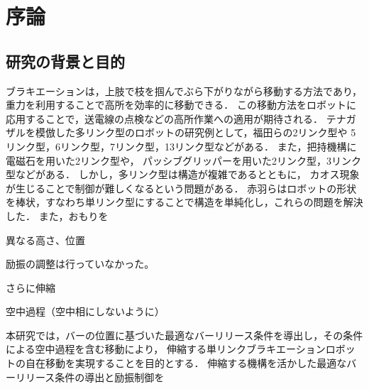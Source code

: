 \chapter[序論]%
        {序論}
        \section{研究の背景と目的}

          ブラキエーションは，上肢で枝を掴んでぶら下がりながら移動する方法であり，重力を利用することで高所を効率的に移動できる．
          この移動方法をロボットに応用することで\cite{福田敏男1990ブラキエーション形移動ロボットの研究}，送電線の点検などの高所作業への適用が期待される．
          テナガザルを模倣した多リンク型のロボットの研究例として，福田らの2リンク型\cite{福田敏男1991ブラキエーション形移動ロボットの研究2}\cite{福田敏男1992ブラキエーション形移動ロボットの研究}\cite{齋藤史倫1993ブラキエーション形移動ロボットの研究}\cite{齋藤史倫1995学習とロボット}\cite{福田敏男1996強化学習法を用いたファジィコントローラの生成}\cite{中西淳1998解析的手法による}\cite{中西淳19992}\cite{中西淳2001ハイブリッドコントローラによる}や
          5リンク型\cite{福田敏男1991ブラキエーション形移動ロボットの研究}，6リンク型\cite{福田敏男1990ブラキエーション形移動ロボットの研究}，7リンク型\cite{齋藤史倫1994ブラキエーション形移動ロボットの研究}，13リンク型\cite{長谷川泰久2001ブラキエーション形移動ロボットの研究}などがある．
          また，把持機構に電磁石を用いた2リンク型\cite{山川雄司2016ブラキエーションロボットの開発と運動生成}\cite{山川雄司2016-2ブラキエーションロボットの開発と運動生成}や，
          パッシブグリッパーを用いた2リンク型\cite{javadi2023acromonk}，3リンク型\cite{grama2024ricmonk}などがある．
          しかし，多リンク型は構造が複雑であるとともに，
          カオス現象\cite{鈴木三男2000二重振り子におけるカオス的振舞}が生じることで制御が難しくなるという問題がある．
          赤羽らはロボットの形状を棒状，すなわち単リンク型にすることで構造を単純化し，これらの問題を解決した\cite{akahane2022single}．
          また，おもりを


          異なる高さ、位置

          励振の調整は行っていなかった。

          さらに伸縮

          空中過程（空中相にしないように）

          本研究では，バーの位置に基づいた最適なバーリリース条件を導出し，その条件による空中過程を含む移動により，
          伸縮する単リンクブラキエーションロボットの自在移動を実現することを目的とする．
          伸縮する機構を活かした最適なバーリリース条件の導出と励振制御を




